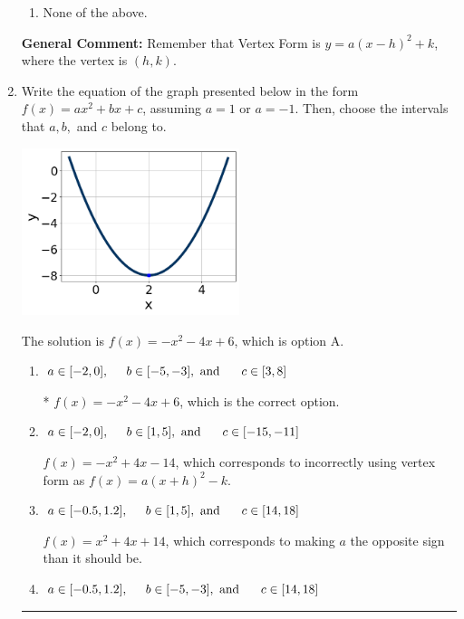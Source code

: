 \documentclass{extbook}[14pt]
\newcommand{\litem}[1]{\item #1

\rule{\textwidth}{0.4pt}}
\begin{document}
\begin{enumerate}
{\begin{enumerate}[label=\Alph*.]
\begin{multicols}{2}
\end{multicols}\item None of the above.\end{enumerate}
\textbf{General Comment:} Remember that Vertex Form is $y = a(x-h)^2+k$, where the vertex is $(h, k)$.
}
\litem{
Write the equation of the graph presented below in the form $f(x)=ax^2+bx+c$, assuming  $a=1$ or $a=-1$. Then, choose the intervals that $a, b,$ and $c$ belong to.

\begin{center}
    \includegraphics[width=0.5\textwidth]{../Figures/quadraticGraphToEquationB.png}
\end{center}


The solution is \( f(x) = -x^{2} -4 x + 6 \), which is option A.\begin{enumerate}[label=\Alph*.]
\item \( a \in [-2, 0], \hspace*{5mm} b \in [-5, -3], \text{ and } \hspace*{5mm} c \in [3, 8] \)

* $f(x)=-x^{2} -4 x + 6$, which is the correct option.
\item \( a \in [-2, 0], \hspace*{5mm} b \in [1, 5], \text{ and } \hspace*{5mm} c \in [-15, -11] \)

$f(x)=-x^{2} +4 x -14$, which corresponds to incorrectly using vertex form as $f(x) = a(x+h)^2 - k$.
\item \( a \in [-0.5, 1.2], \hspace*{5mm} b \in [1, 5], \text{ and } \hspace*{5mm} c \in [14, 18] \)

$f(x)=x^{2} +4 x + 14$, which corresponds to making $a$ the opposite sign than it should be.
\item \( a \in [-0.5, 1.2], \hspace*{5mm} b \in [-5, -3], \text{ and } \hspace*{5mm} c \in [14, 18] \)


\end{enumerate}}
\end{enumerate}
\end{document}
